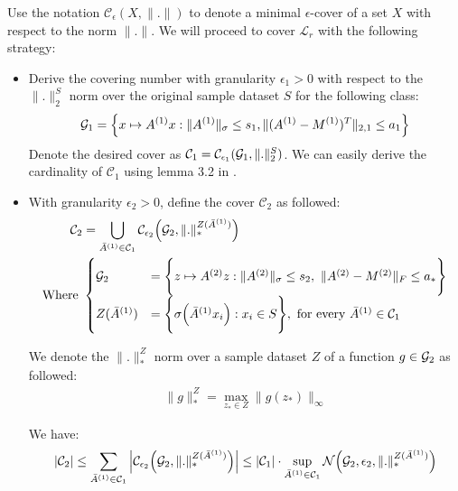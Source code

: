 \noindent Use the notation $\mathcal{C}_\epsilon(X, \|.\|)$ to denote a minimal $\epsilon$-cover of a set $X$ with respect to the norm $\|.\|$. We will proceed to cover $\mathcal{L}_r$ with the following strategy:

\begin{itemize}
    \item Derive the covering number with granularity $\epsilon_1 > 0$ with respect to the $\|.\|_2^S$ norm over the original sample dataset $S$ for the following class: 
    \begin{align*}
        \mathcal{G}_1 = \Big\{ 
            x \mapsto A^{(1)}x : \|A^{(1)}\|_\sigma \le s_1, \|(A^{(1)} - M^{(1)})^T\|_{2, 1} \le a_1
         \Big\} 
    \end{align*}
    Denote the desired cover as $\mathcal{C}_1 = \mathcal{C}_{\epsilon_1}({\mathcal{G}_1}, \|.\|_2^S)$. We can easily derive the cardinality of $\mathcal{C}_1$ using lemma 3.2 in \cite{article:bartlett}.

    \item With granularity $\epsilon_2 > 0$, define the cover $\mathcal{C}_2$ as followed:
    \begin{align*}
       \mathcal{C}_2 &= \bigcup_{\bar A^{(1)} \in \mathcal{C}_1} \mathcal{C}_{\epsilon_2} \bigRound{
            \G_2, \|.\|_*^{Z(\bar A^{(1)})}
       } \\
       \text{Where } &\begin{cases}
            \G_2 &= \biggCurl{
                    z \mapsto A^{(2)}z : \|A^{(2)}\|_\sigma \le s_2, \ \|A^{(2)} - M^{(2)}\|_F \le a_*
            } \\
            Z(\bar A^{(1)}) &= \biggCurl{ \sigma\bigRound{\bar A^{(1)}x_i} : x_i \in S }, \ \text{for every } \bar A^{(1)}\in\mathcal{C}_1
       \end{cases}
    \end{align*}

    We denote the $\|.\|_*^Z$ norm over a sample dataset $Z$ of a function $g\in\mathcal{G}_2$ as followed:
    \begin{align*}
        \|g\|_*^Z = \max_{z_* \in Z} \|g(z_*)\|_\infty
    \end{align*}

    We have:
    \begin{align*}
        |\mathcal{C}_2| \le \sum_{\bar A^{(1)} \in \mathcal{C}_1} \Big| 
            \mathcal{C}_{\epsilon_2} \Big( 
                \mathcal{G}_2, \|.\|_*^{Z(\bar A^{(1)})}
             \Big) 
         \Big| \le |\mathcal{C}_1| \cdot \sup_{\bar A^{(1)} \in \mathcal{C}_1} \mathcal{N}\Big( 
            \mathcal{G}_2, \epsilon_2, \|.\|_*^{Z(\bar A^{(1)})}
         \Big)
    \end{align*}


\end{itemize}
